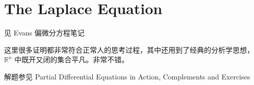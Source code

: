 \section{The Laplace Equation}

见 Evans 偏微分方程笔记

\begin{remark}
这里很多证明都非常符合正常人的思考过程，其中还用到了经典的分析学思想，$\mathbb{R}^{n}$ 中既开又闭的集合平凡。非常不错。
\end{remark}
解题参见 Partial Differential Equations in Action, Complements and Exercises
